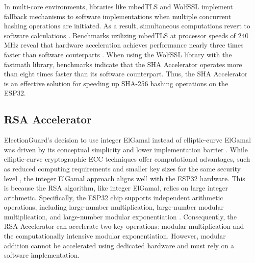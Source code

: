 In multi-core environments, libraries like mbedTLS and WolfSSL implement fallback mechanisms to software implementations when multiple concurrent hashing operations are initiated. As a result, simultaneous computations revert to software calculations \cite{mbedTLS-fork} \cite{wolfSSL-port}. Benchmarks uzilizing mbedTLS at processor speeds of 240 MHz reveal that hardware acceleration achieves performance nearly three times faster than software couterparts \cite[41-42]{eval-crypto}. When using the WolfSSL library with the fastmath library, benchmarks indicate that the \ac{SHA} Accelerator operates more than eight times faster than its software counterpart. Thus, the \ac{SHA} Accelerator is an effective solution for speeding up SHA-256 hashing operations on the ESP32.

\subsection{\ac{RSA} Accelerator}

ElectionGuard's decision to use integer ElGamal instead of elliptic-curve ElGamal was driven by its conceptual simplicity and lower implementation barrier \cite[7]{eg-paper}. While elliptic-curve cryptographic \ac{ECC} techniques offer computational advantages, such as reduced computing requirements and smaller key sizes for the same security level \cite[1, 6]{ecc-eval}, the integer ElGamal approach aligns well with the ESP32 hardware. This is because the RSA algorithm, like integer ElGamal, relies on large integer arithmetic. Specifically, the ESP32 chip supports independent arithmetic operations, including large-number multiplication, large-number modular multiplication, and large-number modular exponentiation \cite[32]{esp32-series} \cite[603]{esp32-ref}. Consequently, the RSA Accelerator can accelerate two key operations: modular multiplication and the computationally intensive modular exponentiation. However, modular addition cannot be accelerated using dedicated hardware and must rely on a software implementation.


